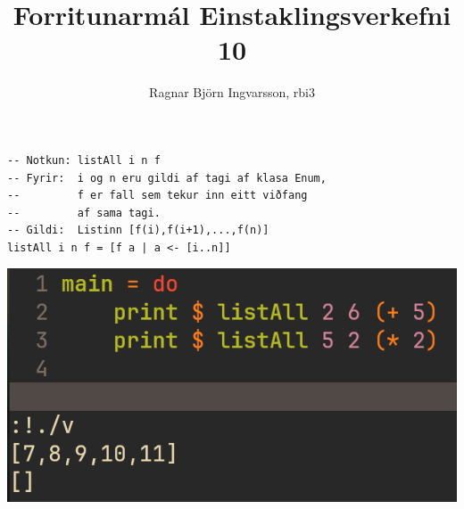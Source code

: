 \documentclass{article}
\title{Forritunarmál Einstaklingsverkefni 10}
\author{Ragnar Björn Ingvarsson, rbi3}
\begin{document}
\renewcommand\thepage{}

	\maketitle

	\newpage
	\setcounter{page}{1}
	\renewcommand\thepage{\arabic{page}}

	\section{}
	\begin{verbatim}
-- Notkun: listAll i n f
-- Fyrir:  i og n eru gildi af tagi af klasa Enum, 
--         f er fall sem tekur inn eitt viðfang
--         af sama tagi.
-- Gildi:  Listinn [f(i),f(i+1),...,f(n)]
listAll i n f = [f a | a <- [i..n]]
	\end{verbatim}
    \vspace{.5em}
	\begin{center}
		\includegraphics[scale=0.35]{la.png}
	\end{center}
\end{document}
